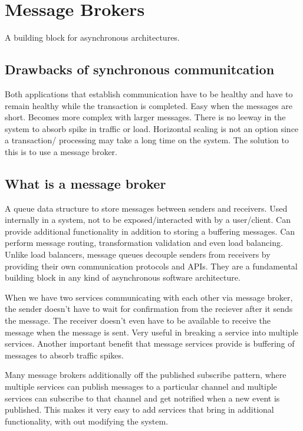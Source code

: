 \documentclass[a4paper, 11pt]{book}
\begin{document}
    \section{Message Brokers}
    A building block for asynchronous architectures.

    \subsection{Drawbacks of synchronous communitcation}
    Both applications that establish communication have to be healthy and have to remain healthy while the transaction is completed.
    Easy when the messages are short.
    Becomes more complex with larger messages.
    There is no leeway in the system to absorb spike in traffic or load.
    Horizontal scaling is not an option since a transaction/ processing may take a long time on the system.
    The solution to this is to use a message broker.

    \subsection{What is a message broker}
    A queue data structure to store messages between senders and receivers.
    Used internally in a system, not to be exposed/interacted with by a user/client.
    Can provide additional functionality in addition to storing a buffering messages.
    Can perform message routing, transformation validation and even load balancing.
    Unlike load balancers, message queues decouple senders from receivers by providing their own communication protocols and APIs.
    They are a fundamental building block in any kind of asynchronous software architecture.

    When we have two services communicating with each other via message broker, the sender doesn't have to wait for confirmation from the reciever after it sends the message.
    The receiver doesn't even have to be available to receive the message when the message is sent.
    Very useful in breaking a service into multiple services.
    Another important benefit that message services provide is buffering of messages to absorb traffic spikes.

    Many message brokers additionally off the published subscribe pattern, where multiple services can publish messages to a particular channel and multiple services can subscribe to that channel and get notrified when a new event is published.
    This makes it very easy to add services that bring in additional functionality, with out modifying the system.
\end{document}
